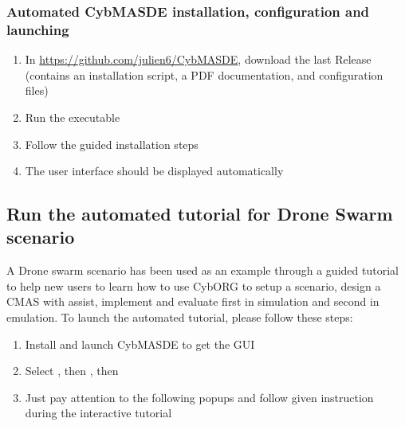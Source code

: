 \documentclass[sigconf]{aamas}
\begin{document}
\subsubsection*{Automated CybMASDE installation, configuration and launching}
\begin{enumerate}
  \item In \url{https://github.com/julien6/CybMASDE}, download the last Release (contains an installation script, a PDF documentation, and configuration files)
  \item Run the  executable
  \item Follow the guided installation steps
  \item The user interface should be displayed automatically
\end{enumerate}


\subsection*{Run the automated tutorial for Drone Swarm scenario}

A Drone swarm scenario has been used as an example through a guided tutorial to help new users to learn how to use CybORG to setup a scenario, design a CMAS with assist, implement and evaluate first in simulation and second in emulation. To launch the automated tutorial, please follow these steps:

\begin{enumerate}
  \item Install and launch CybMASDE to get the GUI
  \item Select , then , then 
  \item Just pay attention to the following popups and follow given instruction during the interactive tutorial
\end{enumerate}

\newpage

\end{document}
